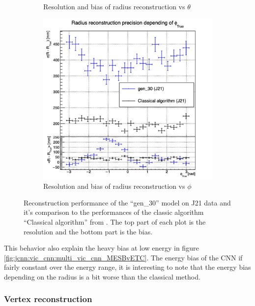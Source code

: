 \documentclass[../main.tex]{subfiles}
\begin{document}
\begin{figure}[ht]
\begin{subfigure}[t]{0.32\linewidth}
    \caption{Resolution and bias of radius reconstruction vs $\theta$}
    \label{fig:jcnn:vic_cnn:multi_vic_cnn_MSBvTTC}
  \end{subfigure}
  \begin{subfigure}[t]{0.32\linewidth}
    \centering
    \includegraphics[width=\linewidth]{images/jcnn/vic_cnn/multi_vic_cnn_MSBvPTC.png}
    \caption{Resolution and bias of radius reconstruction vs $\phi$}
    \label{fig:jcnn:vic_cnn:multi_vic_cnn_MSBvPTC}
  \end{subfigure}
  \caption{Reconstruction performance of the ``gen\_30'' model on J21 data and it's comparison to the performances of the classic algorithm ``Classical algorithm'' from \cite{lebrin_towards_2022}. The top part of each plot is the resolution and the bottom part is the bias.}
  \label{fig:jcnn:vic_cnn}
\end{figure}

This behavior also explain the heavy bias at low energy in figure \ref{fig:jcnn:vic_cnn:multi_vic_cnn_MESBvETC}. The energy bias of the CNN if fairly constant over the energy range, it is interesting to note that the energy bias depending on the radius is a bit worse than the classical method.

\subsubsection{Vertex reconstruction}
\end{document}
